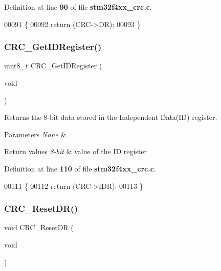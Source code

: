 Definition at line \textbf{ 90} of file \textbf{ stm32f4xx\+\_\+crc.\+c}.


\begin{DoxyCode}
00091 \{
00092   \textcolor{keywordflow}{return} (CRC->DR);
00093 \}
\end{DoxyCode}
\mbox{\label{group__CRC_gaf869f6e9c3ca0ae0822cfad1abea7e5f}} 
\subsubsection{C\+R\+C\+\_\+\+Get\+I\+D\+Register()}
{\footnotesize\ttfamily uint8\+\_\+t C\+R\+C\+\_\+\+Get\+I\+D\+Register (\begin{DoxyParamCaption}\item[{void}]{ }\end{DoxyParamCaption})}



Returns the 8-\/bit data stored in the Independent Data(\+I\+D) register. 


\begin{DoxyParams}{Parameters}
{\em None} & \\
\hline
\end{DoxyParams}

\begin{DoxyRetVals}{Return values}
{\em 8-\/bit} & value of the ID register \\
\hline
\end{DoxyRetVals}


Definition at line \textbf{ 110} of file \textbf{ stm32f4xx\+\_\+crc.\+c}.


\begin{DoxyCode}
00111 \{
00112   \textcolor{keywordflow}{return} (CRC->IDR);
00113 \}
\end{DoxyCode}
\mbox{\label{group__CRC_ga506467d5ef873a5a4ade4ae83cb110f6}} 
\subsubsection{C\+R\+C\+\_\+\+Reset\+D\+R()}
{\footnotesize\ttfamily void C\+R\+C\+\_\+\+Reset\+DR (\begin{DoxyParamCaption}\item[{void}]{ }\end{DoxyParamCaption})}




